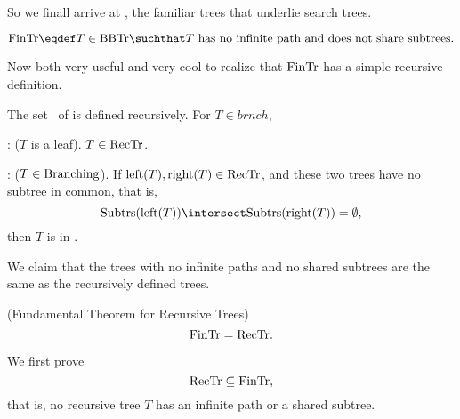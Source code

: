 So we finall arrive at \fintr, the familiar trees that underlie search trees.
\begin{definition}
\[
\fintr \eqdef T \in \brnch \suchthat T\ \text{has no infinite path and
  does not share subtrees}.
\]
\end{definition}

Now both very useful and very cool to realize that $\text{FinTr}$ has a
simple recursive definition.

\begin{definition}
The set \rectr\ of  is defined recursively.  For $T \in brnch$,

: ($T$ is a leaf).  $T \in \text{RecTr}$.

: ($T \in \text{Branching}$).
If $\text{left}(T), \text{right}(T) \in \text{RecTr}$, and these two trees
have no subtree in common, that is,
\[
\subbrn{\leftsub{(T)}} \intersect \subbrn{\rightsub{(T)}} = \emptyset,
\]
then $T$ is in \rectr.
\end{definition}

We claim that the trees with no infinite paths and no shared subtrees
are the same as the recursively defined trees.

\begin{theorem}\label{fundthmrec}(Fundamental Theorem for Recursive Trees)
\[
\text{FinTr} = \text{RecTr}.
\]
\end{theorem}

We first prove
\begin{equation}\label{rectrsubfintr}
\text{RecTr} \subseteq \text{FinTr},
\end{equation}
that is, no recursive tree $T$ has an infinite path or a shared subtree.

